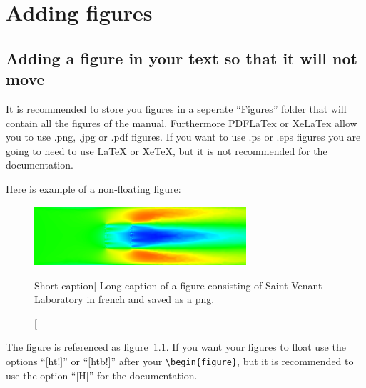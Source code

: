\chapter{Adding figures}

\section[Short section title]{Adding a figure in your text so that it will not move}

It is recommended to store you figures in a seperate ``Figures'' folder that will contain all the figures of the manual. Furthermore PDFLaTex or
XeLaTex allow you to use .png, .jpg or .pdf figures. If you want to use .ps or .eps figures you are going to need to use LaTeX or XeTeX, but it is not recommended for the \telemacsystem{} documentation.

Here is example of a non-floating figure:

\begin{figure}[H]%
\begin{center}
%
  \includegraphics[width=0.7\textwidth]{./FigExample/ExampleImage}
%
\end{center}
\caption
[Short caption]
{Long caption of a figure consisting of Saint-Venant Laboratory in french and saved as a png\protect\footnotemark.}
\label{fig:ExampleImage}
\end{figure}

The figure is referenced as figure~\ref{fig:ExampleImage}. If you want your figures to float use the options ``[ht!]'' or ``[htb!]'' after your
\verb+\begin{figure}+, but it is recommended to use the option ``[H]'' for the \telemacsystem{} documentation.

